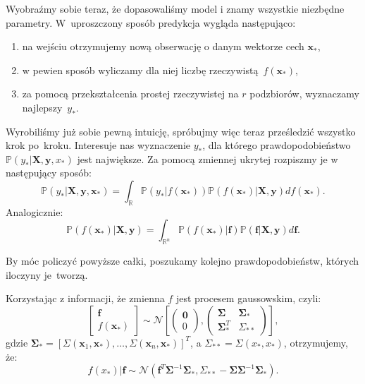 \documentclass{mini}
\begin{document}
Wyobraźmy sobie teraz, że dopasowaliśmy model i znamy wszystkie niezbędne parametry. W~uproszczony sposób predykcja wygląda następująco: 
\begin{enumerate}
\item na wejściu otrzymujemy nową obserwację o danym wektorze cech $\textbf{x}_{\ast}$,
\item w pewien sposób wyliczamy dla niej liczbę rzeczywistą~$f(\mathbf{x}_{\ast})$,
\item  za pomocą przekształcenia prostej rzeczywistej na $r$ podzbiorów, wyznaczamy najlepszy~$y_{\ast}$.
\end{enumerate}

Wyrobiliśmy już sobie pewną intuicję, spróbujmy więc teraz prześledzić wszystko krok po~kroku. Interesuje nas wyznaczenie $y_{\ast}$, dla którego prawdopodobieństwo $\mathbb{P}(y_{\ast} | \textbf{X}, \textbf{y}, x_{\ast})$ jest największe. Za pomocą zmiennej ukrytej rozpiszmy je w następujący sposób:
\begin{equation}\label{calka1}
\mathbb{P}(y_{\ast} | \textbf{X}, \textbf{y}, \mathbf{x}_{\ast}) = \int_{\mathbb{R}} \mathbb{P}(y_{\ast} | f(\mathbf{x}_{\ast}))\mathbb{P}(f(\mathbf{x}_{\ast}) | \textbf{X}, \textbf{y}) df(\mathbf{x}_{\ast}).
\end{equation}
Analogicznie:
\begin{equation}\label{calka2}
\mathbb{P}(f(\mathbf{x}_{\ast}) | \textbf{X}, \textbf{y}) = \int_{\mathbb{R}^n} \mathbb{P}(f(\mathbf{x}_{\ast}) | \mathbf{f})\mathbb{P}(\mathbf{f} | \textbf{X}, \textbf{y}) d\mathbf{f}.
\end{equation}

By móc policzyć powyższe całki, poszukamy kolejno prawdopodobieństw, których iloczyny je~tworzą.

Korzystając z informacji, że zmienna $f$ jest procesem gaussowskim, czyli:
$$
\left[
	\begin{array}{c}
		\mathbf{f}\\
		f(\mathbf{x}_{\ast})
	\end{array}
\right] \sim \mathcal{N}
\left[
\left(
	\begin{array}{c}
		\mathbf{0}\\
		0
	\end{array}
\right)
,
\left(
	\begin{array}{cc}
		\mathbf{\Sigma} & \mathbf{\Sigma}_{\ast}\\
		\mathbf{\Sigma}_{\ast}^T & \Sigma_{\ast\ast}
	\end{array}
\right)
\right],
$$ 
gdzie $\mathbf{\Sigma}_{\ast} = [\Sigma(\mathbf{x}_1, \mathbf{x}_{\ast}), \ldots, \Sigma(\mathbf{x}_n, \mathbf{x}_{\ast})]^T$, a $\Sigma_{\ast\ast} = \Sigma(x_{\ast}, x_{\ast})$, otrzymujemy, że: 
\begin{equation}\label{calka21}
f(x_{\ast}) | \mathbf{f} \sim \mathcal{N}(\mathbf{f}^T\mathbf{\Sigma}^{-1}\mathbf{\Sigma}_{\ast}, \Sigma_{\ast\ast} - \mathbf{\Sigma}\mathbf{\Sigma}^{-1}\mathbf{\Sigma}_{\ast} ).
\end{equation}
\end{document}
